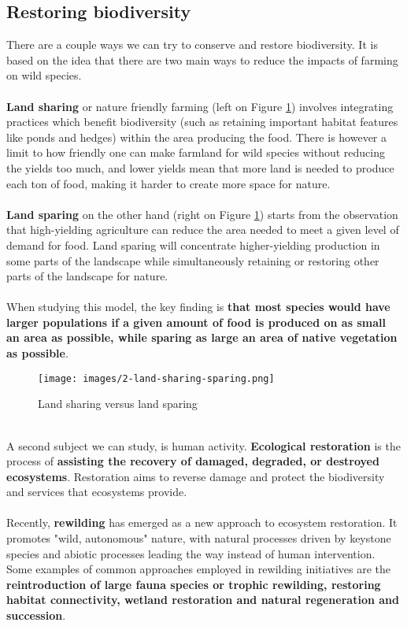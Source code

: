 \documentclass[../summary.tex]{subfiles}
\begin{document}
\subsection{Restoring biodiversity}
There are a couple ways we can try to conserve and restore biodiversity. It is based on the idea that there are two main ways to reduce the impacts of farming on wild species.
\\\\
\textbf{Land sharing} or nature friendly farming (left on Figure \ref{fig:land-sharing-sparing}) involves integrating practices which benefit biodiversity (such as retaining important habitat features like ponds and hedges) within the area producing the food. There is however a limit to how friendly one can make farmland for wild species without reducing the yields too much, and lower yields mean that more land is needed to produce each ton of food, making it harder to create more space for nature.
\\\\
\textbf{Land sparing} on the other hand (right on Figure \ref{fig:land-sharing-sparing}) starts from the observation that high-yielding agriculture can reduce the area needed to meet a given level of demand for food. Land sparing will concentrate higher-yielding production in some parts of the landscape while simultaneously retaining or restoring other parts of the landscape for nature.
\\\\
When studying this model, the key finding is \textbf{that most species would have larger populations if a given amount of food is produced on as small an area as possible, while sparing as large an area of native vegetation as possible}.
\\
\begin{figure}[htbp]
	\centering
	\texttt{[image: images/2-land-sharing-sparing.png]}
	\caption{Land sharing versus land sparing}
	\label{fig:land-sharing-sparing}
\end{figure}
\ \\
A second subject we can study, is human activity. \textbf{Ecological restoration} is the process of \textbf{assisting the recovery of damaged, degraded, or destroyed ecosystems}. Restoration aims to reverse damage and protect the biodiversity and services that ecosystems provide.
\\\\
Recently, \textbf{rewilding} has emerged as a new approach to ecosystem restoration. It promotes "wild, autonomous" nature, with natural processes driven by keystone species and abiotic processes leading the way instead of human intervention. Some examples of common approaches employed in rewilding initiatives are the \textbf{reintroduction of large fauna species or trophic rewilding, restoring habitat connectivity, wetland restoration and natural regeneration and succession}.
\end{document}
